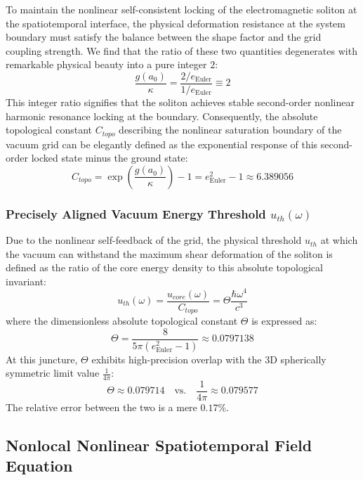 \documentclass[12pt, a4paper]{article}
\begin{document}
To maintain the nonlinear self-consistent locking of the electromagnetic soliton at the spatiotemporal interface, the physical deformation resistance at the system boundary must satisfy the balance between the shape factor and the grid coupling strength. We find that the ratio of these two quantities degenerates with remarkable physical beauty into a pure integer $2$:
\begin{equation}
\frac{g(a_0)}{\kappa} = \frac{2/e_{\text{Euler}}}{1/e_{\text{Euler}}} \equiv 2
\end{equation}
This integer ratio signifies that the soliton achieves stable second-order nonlinear harmonic resonance locking at the boundary. Consequently, the absolute topological constant $C_{topo}$ describing the nonlinear saturation boundary of the vacuum grid can be elegantly defined as the exponential response of this second-order locked state minus the ground state:
\begin{equation}
C_{topo} = \exp\left( \frac{g(a_0)}{\kappa} \right) - 1 = e_{\text{Euler}}^2 - 1 \approx 6.389056
\end{equation}

\subsubsection{Precisely Aligned Vacuum Energy Threshold $u_{th}(\omega)$}

Due to the nonlinear self-feedback of the grid, the physical threshold $u_{th}$ at which the vacuum can withstand the maximum shear deformation of the soliton is defined as the ratio of the core energy density to this absolute topological invariant:
\begin{equation}
u_{th}(\omega) = \frac{u_{core}(\omega)}{C_{topo}} = \Theta \frac{\hbar \omega^4}{c^3}
\end{equation}
where the dimensionless absolute topological constant $\Theta$ is expressed as:
\begin{equation}
\Theta = \frac{8}{5\pi \left( e_{\text{Euler}}^2 - 1 \right)} \approx 0.0797138
\end{equation}
At this juncture, $\Theta$ exhibits high-precision overlap with the 3D spherically symmetric limit value $\frac{1}{4\pi}$:
\begin{equation}
\Theta \approx 0.079714 \quad \text{vs.} \quad \frac{1}{4\pi} \approx 0.079577
\end{equation}
The relative error between the two is a mere $0.17\%$.

\subsection{Nonlocal Nonlinear Spatiotemporal Field Equation}
\end{document}
